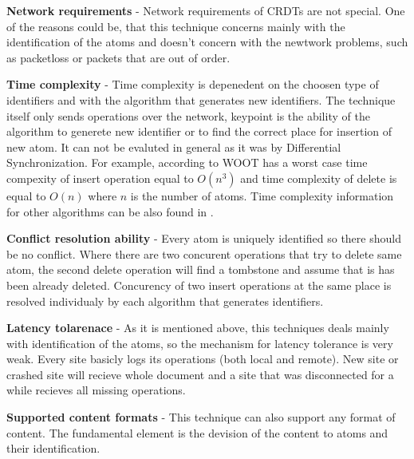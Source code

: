 \documentclass[12pt,oneside]{fithesis2}
\begin{document}
\vspace{3mm} 

\textbf{Network requirements} - Network requirements of CRDTs are not special. One of the reasons could be, that this technique concerns mainly with the identification of the atoms and doesn't concern with the newtwork problems, such as packetloss or packets that are out of order.

\vspace{3mm} 

\textbf{Time complexity} - Time complexity is depenedent on the choosen type of identifiers and with the algorithm that generates new identifiers. The technique itself only sends operations over the network, keypoint is the ability of the algorithm to generete new identifier or to find the correct place for insertion of new atom. It can not be evaluted in general as it was by Differential Synchronization. For example, according to \cite{CRDT-real} WOOT has a worst case time compexity of insert operation equal to \(O(n^3)\) and time complexity of delete is equal to \(O(n)\) where \(n\) is the number of atoms. Time complexity information for other algorithms can be also found in \cite{CRDT-real}.

\vspace{3mm} 

\textbf{Conflict resolution ability} - Every atom is uniquely identified so there should be no conflict. Where there are two concurent operations that try to delete same atom, the second delete operation will find a tombstone and assume that is has been already deleted. Concurency of two insert operations at the same place is resolved individualy by each algorithm that generates identifiers.

\vspace{3mm} 

\textbf{Latency tolarenace} - As it is mentioned above, this techniques deals mainly with identification of the atoms, so the mechanism for latency tolerance is very weak. Every site basicly logs its operations (both local and remote). New site or crashed site will recieve whole document and a site that was disconnected for a while recieves all missing operations.

\vspace{3mm} 

\textbf{Supported content formats} - This technique can also support any format of content. The fundamental element is the devision of the content to atoms and their identification. 
\end{document}
